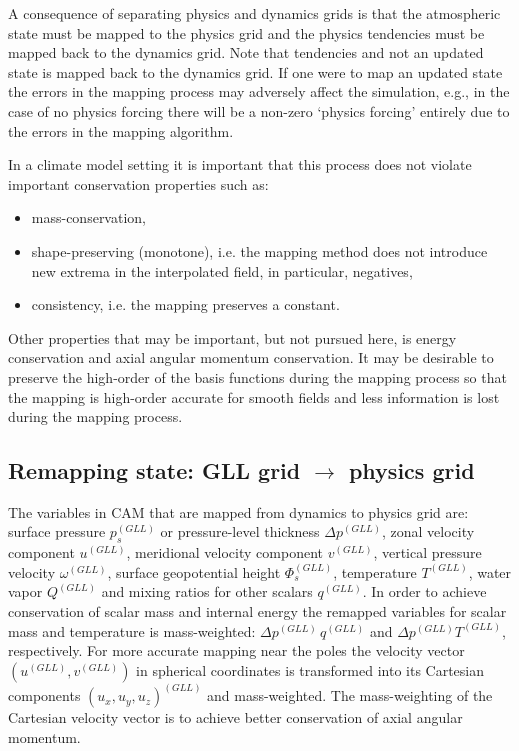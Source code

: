 A consequence of separating physics and dynamics grids is that the atmospheric state must be mapped to the physics grid and the physics tendencies must be mapped back to the dynamics grid. Note that tendencies and not an updated state is mapped back to the dynamics grid. If one were to map an updated state the errors in the mapping process may adversely affect the simulation, e.g., in the case of no physics forcing there will be a non-zero `physics forcing' entirely due to the errors in the mapping algorithm.

In a climate model setting it is important that this process does not violate important conservation properties such as:
\begin{itemize}
\item mass-conservation,
\item shape-preserving (monotone), i.e. the mapping method does not introduce new extrema in the interpolated field, in particular, negatives,
\item consistency, i.e. the mapping preserves a constant.
\end{itemize}
Other properties that may be important, but not pursued here, is energy conservation and axial angular momentum conservation. It may be desirable to preserve the high-order of the basis functions during the mapping process so that the mapping is high-order accurate for smooth fields and less information is lost during the mapping process. 


\subsection{Remapping state: GLL grid $\rightarrow$ physics grid}
The variables in CAM that are mapped from dynamics to physics grid are: surface pressure $p_s^{(GLL)}$ or pressure-level thickness $\Delta p^{(GLL)}$, zonal velocity component $u^{(GLL)}$, meridional velocity component $v^{(GLL)}$, vertical pressure velocity $\omega^{(GLL)}$, surface geopotential height $\Phi_s^{(GLL)}$, temperature $T^{(GLL)}$, water vapor $Q^{(GLL)}$ and mixing ratios for other scalars $q^{(GLL)}$. In order to achieve conservation of scalar mass and internal energy the remapped variables for scalar mass and temperature is mass-weighted: $\Delta p^{(GLL)}\, q^{(GLL)}$ and $\Delta p^{(GLL)} T^{(GLL)}$, respectively. For more accurate mapping near the poles the velocity vector $(u^{(GLL)},v^{(GLL)})$ in spherical coordinates is transformed into its Cartesian components $(u_x,u_y,u_z)^{(GLL)}$ and mass-weighted. The mass-weighting of the Cartesian velocity vector is to achieve better conservation of axial angular momentum.

